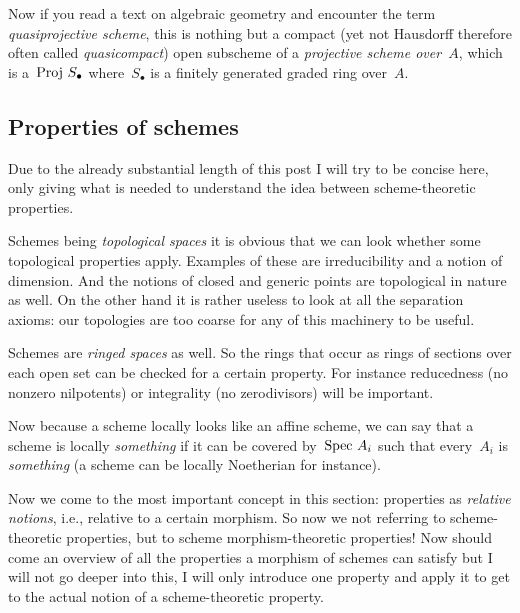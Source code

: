 \begin{remark}
  Now if you read a text on algebraic geometry and encounter the term \emph{quasiprojective scheme}, this is nothing but a compact (yet not Hausdorff therefore often called \emph{quasicompact}) open subscheme of a \emph{projective scheme over~$A$}, which is a~$\operatorname{Proj\,} S_\bullet$ where~$S_\bullet$ is a finitely generated graded ring over~$A$.
\end{remark}


\subsection{Properties of schemes}
Due to the already substantial length of this post I will try to be concise here, only giving what is needed to understand the idea between scheme-theoretic properties.

\begin{example}
  Schemes being \emph{topological spaces} it is obvious that we can look whether some topological properties apply. Examples of these are irreducibility and a notion of dimension. And the notions of closed and generic points are topological in nature as well. On the other hand it is rather useless to look at all the separation axioms: our topologies are too coarse for any of this machinery to be useful.
\end{example}

\begin{example}
  Schemes are \emph{ringed spaces} as well. So the rings that occur as rings of sections over each open set can be checked for a certain property. For instance reducedness (no nonzero nilpotents) or integrality (no zerodivisors) will be important.
\end{example}

\begin{example}
  Now because a scheme locally looks like an affine scheme, we can say that a scheme is locally \emph{something} if it can be covered by~$\operatorname{Spec\,} A_i$ such that every~$A_i$ is \emph{something} (a scheme can be locally Noetherian for instance).
\end{example}

\begin{example}
   Now we come to the most important concept in this section: properties as \emph{relative notions}, i.e., relative to a certain morphism. So now we not referring to scheme-theoretic properties, but to scheme morphism-theoretic properties! Now should come an overview of all the properties a morphism of schemes can satisfy but I will not go deeper into this, I will only introduce one property and apply it to get to the actual notion of a scheme-theoretic property. 
\end{example}

